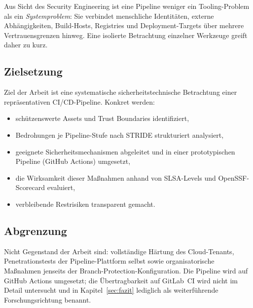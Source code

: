 \documentclass[12pt, a4paper]{scrartcl}
\begin{document}
Aus Sicht des Security Engineering ist eine Pipeline weniger ein Tooling-Problem
als ein \emph{Systemproblem}: Sie verbindet menschliche Identitäten,
externe Abhängigkeiten, Build-Hosts, Registries und Deployment-Targets über
mehrere Vertrauensgrenzen hinweg. Eine isolierte Betrachtung einzelner Werkzeuge
greift daher zu kurz.

\subsection{Zielsetzung}
Ziel der Arbeit ist eine systematische sicherheitstechnische Betrachtung einer
repräsentativen CI/CD-Pipeline. Konkret werden:
\begin{itemize}[leftmargin=1.4em]
  \item schützenswerte Assets und Trust Boundaries identifiziert,
  \item Bedrohungen je Pipeline-Stufe nach STRIDE strukturiert analysiert,
  \item geeignete Sicherheitsmechanismen abgeleitet und in einer
        prototypischen Pipeline (GitHub Actions) umgesetzt,
  \item die Wirksamkeit dieser Maßnahmen anhand von SLSA-Levels und
        OpenSSF-Scorecard evaluiert,
  \item verbleibende Restrisiken transparent gemacht.
\end{itemize}

\subsection{Abgrenzung}
Nicht Gegenstand der Arbeit sind: vollständige Härtung des Cloud-Tenants,
Penetrationstests der Pipeline-Plattform selbst sowie organisatorische
Maßnahmen jenseits der Branch-Protection-Konfiguration. Die Pipeline wird
auf GitHub Actions umgesetzt; die Übertragbarkeit auf GitLab~CI wird
nicht im Detail untersucht und in Kapitel~\ref{sec:fazit} lediglich als
weiterführende Forschungsrichtung benannt.
\end{document}
